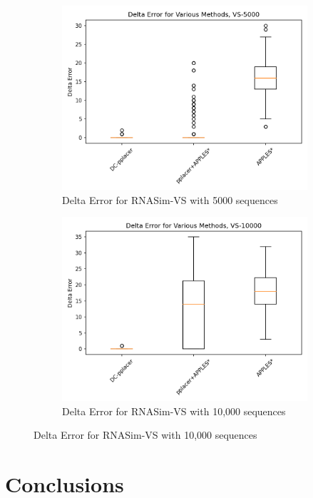 \documentclass[10pt]{article}
\begin{document}
\begin{figure}[!htb]
\begin{subfigure}{0.5\textwidth}
\centering
\includegraphics[width=\textwidth]{Figs/VS-delta-error-5000-BW.png}
\caption{Delta Error for RNASim-VS with 5000 sequences}
\label{fig:error5000}
\end{subfigure}
\begin{subfigure}{0.5\textwidth}
\centering
\includegraphics[width=\textwidth]{Figs/VS-delta-error-10000-BW.png}
\caption{Delta Error for RNASim-VS with 10,000 sequences}
\label{fig:error10000}
\end{subfigure}
\end{figure}

\section{Conclusions}
\end{document}
